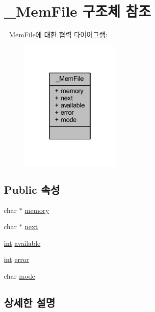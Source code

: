 \hypertarget{struct___mem_file}{}\section{\+\_\+\+Mem\+File 구조체 참조}
\label{struct___mem_file}


\+\_\+\+Mem\+File에 대한 협력 다이어그램\+:\nopagebreak
\begin{figure}[H]
\begin{center}
\leavevmode
\includegraphics[width=142pt]{struct___mem_file__coll__graph}
\end{center}
\end{figure}
\subsection*{Public 속성}
\begin{DoxyCompactItemize}
\item 
char $\ast$ \mbox{\hyperlink{struct___mem_file_a62a96f96df82e23ef6dace974e19b18c}{memory}}
\item 
char $\ast$ \mbox{\hyperlink{struct___mem_file_aa15859f66ae2eb41245e4ba88486d67f}{next}}
\item 
\mbox{\hyperlink{_util_8cpp_a0ef32aa8672df19503a49fab2d0c8071}{int}} \mbox{\hyperlink{struct___mem_file_a1f48066353e37cf16c9a0065abecf238}{available}}
\item 
\mbox{\hyperlink{_util_8cpp_a0ef32aa8672df19503a49fab2d0c8071}{int}} \mbox{\hyperlink{struct___mem_file_a63100edd8050f287d8dc7070d92a55cb}{error}}
\item 
char \mbox{\hyperlink{struct___mem_file_a88cb51a4419fad64ebfd304b5d0cfe36}{mode}}
\end{DoxyCompactItemize}


\subsection{상세한 설명}


